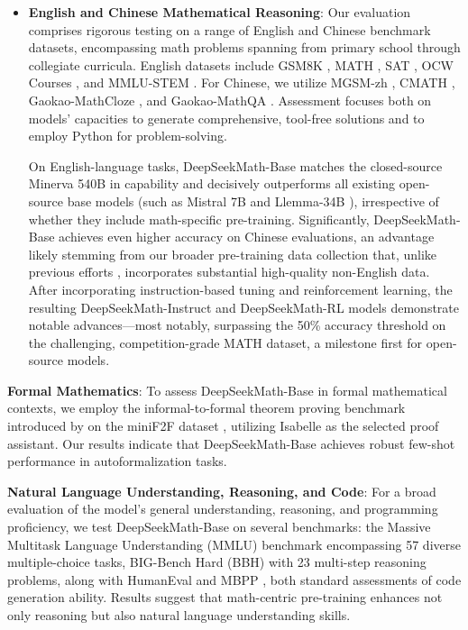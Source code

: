 \begin{itemize}[topsep=0pt]
    \item \textbf{English and Chinese Mathematical Reasoning}: Our evaluation comprises rigorous testing on a range of English and Chinese benchmark datasets, encompassing math problems spanning from primary school through collegiate curricula. English datasets include GSM8K \citep{gsm8k}, MATH \citep{MATH}, SAT \citep{llemma}, OCW Courses \citep{minerva}, and MMLU-STEM \citep{mmlu}. For Chinese, we utilize MGSM-zh \citep{mgsm}, CMATH \citep{wei2023cmath}, Gaokao-MathCloze \citep{agieval}, and Gaokao-MathQA \citep{agieval}. Assessment focuses both on models’ capacities to generate comprehensive, tool-free solutions and to employ Python for problem-solving.

    On English-language tasks, DeepSeekMath-Base matches the closed-source Minerva 540B \citep{minerva} in capability and decisively outperforms all existing open-source base models (such as Mistral 7B \citep{mistral} and Llemma-34B \citep{llemma}), irrespective of whether they include math-specific pre-training. Significantly, DeepSeekMath-Base achieves even higher accuracy on Chinese evaluations, an advantage likely stemming from our broader pre-training data collection that, unlike previous efforts \citep{minerva,llemma}, incorporates substantial high-quality non-English data. After incorporating instruction-based tuning and reinforcement learning, the resulting DeepSeekMath-Instruct and DeepSeekMath-RL models demonstrate notable advances—most notably, surpassing the 50\% accuracy threshold on the challenging, competition-grade MATH dataset, a milestone first for open-source models. 
\end{itemize}

\item \textbf{Formal Mathematics}: To assess DeepSeekMath-Base in formal mathematical contexts, we employ the informal-to-formal theorem proving benchmark introduced by \citep{dsp_proof} on the miniF2F dataset \citep{minif2f}, utilizing Isabelle \citep{isabelle} as the selected proof assistant. Our results indicate that DeepSeekMath-Base achieves robust few-shot performance in autoformalization tasks.

\item \textbf{Natural Language Understanding, Reasoning, and Code}: For a broad evaluation of the model’s general understanding, reasoning, and programming proficiency, we test DeepSeekMath-Base on several benchmarks: the Massive Multitask Language Understanding (MMLU) benchmark \citep{mmlu} encompassing 57 diverse multiple-choice tasks, BIG-Bench Hard (BBH) \citep{bbh} with 23 multi-step reasoning problems, along with HumanEval \citep{codex} and MBPP \citep{mbpp}, both standard assessments of code generation ability. Results suggest that math-centric pre-training enhances not only reasoning but also natural language understanding skills.

